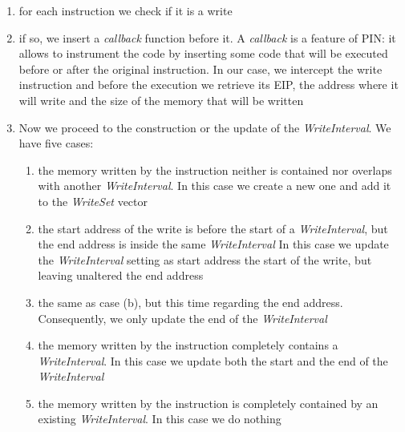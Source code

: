 \begin{enumerate}
\item for each instruction we check if it is a write
\item if so, we insert a \textit{callback} function before it. A \textit{callback} is a feature of PIN: it allows to instrument the code by inserting some code that will be executed before or after the original instruction. In our case, we intercept the write instruction and before the execution we retrieve its EIP, the address where it will write and the size of the memory that will be written
\item Now we proceed to the construction or the update of the \textit{WriteInterval}. We have five cases:
	\begin{enumerate}
	\item the memory written by the instruction neither is contained nor overlaps with another \textit{WriteInterval}. In this case we create a new one and add it to the \textit{WriteSet} vector
	\item the start address of the write is before the start of a \textit{WriteInterval}, but the end address is inside the same \textit{WriteInterval} In this case we update the \textit{WriteInterval} setting as start address the start of the write, but leaving unaltered the end address
	\item the same as case (b), but this time regarding the end address. Consequently, we only update the end of the \textit{WriteInterval} 
	\item the memory written by the instruction completely contains a \textit{WriteInterval}. In this case we update both the start and the end of the \textit{WriteInterval}
	\item the memory written by the instruction is completely contained by an existing \textit{WriteInterval}. In this case we do nothing
	\end{enumerate}
\end{enumerate}